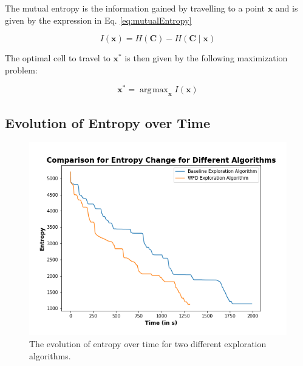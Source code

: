 \documentclass[a4paper,12pt]{article}
\DeclareMathOperator*{\argmax}{\arg\!\max}
\begin{document}
			The mutual entropy is the information gained by travelling to a point $\textbf{x}$ and is given by the expression in Eq. \ref{eq:mutualEntropy}

			\begin{equation}
				I(\textbf{x}) = H \left(\textbf{C}\right) - H(\textbf{C}\mid\textbf{x})
				\label{eq:mutualEntropy}
			\end{equation}

			The optimal cell to travel to $\textbf{x}^{*}$ is then given by the following maximization problem:

			\begin{equation}
				\textbf{x}^{*} = \argmax_{\textbf{x}}I(\textbf{x})
				\label{eq:optimalCell}
			\end{equation}

		\subsection{Evolution of Entropy over Time}

			\begin{figure}[H]
				\centering
				\includegraphics[scale=0.5]{images/EntropyChange.png}
				\caption{The evolution of entropy over time for two different exploration algorithms.}
				\label{EntropyChange}
			\end{figure}
\end{document}
